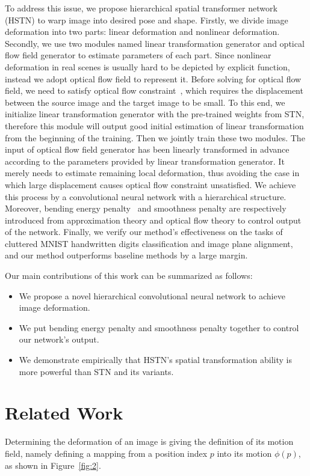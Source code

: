 \documentclass{article}
\begin{document}
To address this issue, we propose hierarchical spatial transformer network (HSTN) to warp image into desired pose and shape.
Firstly, we divide image deformation into two parts: linear deformation and nonlinear deformation. Secondly, we use two modules named linear transformation generator and optical flow field generator to estimate parameters of each part.
Since nonlinear deformation in real scenes is usually hard to be depicted by explicit function, instead we adopt optical flow field to represent it.
Before solving for optical flow field, we need to satisfy optical flow constraint~\cite{Lucas1981An,horn1981determining}, which requires the displacement between the source image and the target image to be small.
To this end, we initialize linear transformation generator with the pre-trained weights from STN, therefore this module will output good initial estimation of linear transformation from the beginning of the training.
Then we jointly train these two modules.
The input of optical flow field generator has been linearly transformed in advance according to the parameters provided by linear transformation generator.
It merely needs to estimate remaining local deformation, thus avoiding the case in which large displacement causes optical flow constraint unsatisfied.
We achieve this process by a convolutional neural network with a hierarchical structure.
Moreover, bending energy penalty~\cite{Galway1990Spline} and smoothness penalty are respectively introduced from approximation theory and optical flow theory to control output of the network.
Finally, we verify our method's effectiveness on the tasks of cluttered MNIST handwritten digits classification and image plane alignment, and our method outperforms baseline methods by a large margin.

Our main contributions of this work can be summarized as follows:
\begin{itemize}
    \item We propose a novel hierarchical convolutional neural network to achieve image deformation.
    \item We put bending energy penalty and smoothness penalty together to control our network's output.
    \item We demonstrate empirically that HSTN's spatial transformation ability is more  powerful than STN and its variants.
\end{itemize}

\section{Related Work}
Determining the deformation of an image is giving the definition of its motion field, namely defining a mapping from a position index $p$ into its motion $\phi (p)$, as shown in Figure~\ref{fig:2}.
\end{document}
